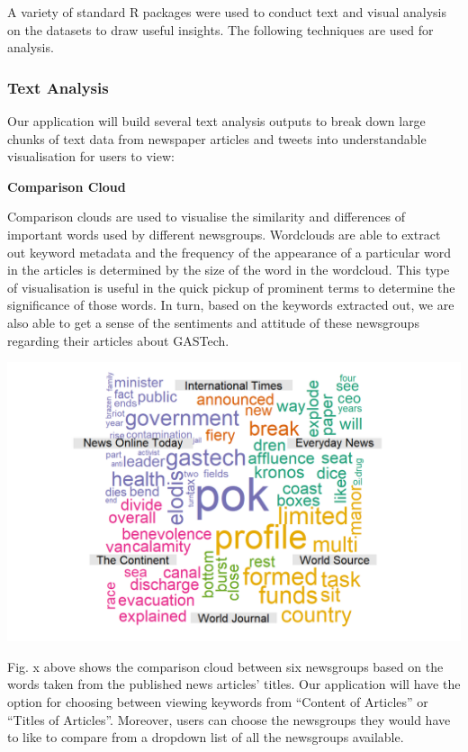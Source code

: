 \documentclass{acm_proc_article-sp}
\begin{document}
A variety of standard R packages were used to conduct text and visual
analysis on the datasets to draw useful insights. The following
techniques are used for analysis.

\hypertarget{text-analysis}{%
\subsubsection{Text Analysis}\label{text-analysis}}

Our application will build several text analysis outputs to break down
large chunks of text data from newspaper articles and tweets into
understandable visualisation for users to view:

\textbf{Comparison Cloud}

Comparison clouds are used to visualise the similarity and differences
of important words used by different newsgroups. Wordclouds are able to
extract out keyword metadata and the frequency of the appearance of a
particular word in the articles is determined by the size of the word in
the wordcloud. This type of visualisation is useful in the quick pickup
of prominent terms to determine the significance of those words. In
turn, based on the keywords extracted out, we are also able to get a
sense of the sentiments and attitude of these newsgroups regarding their
articles about GASTech.

\includegraphics{img/image03.png}

Fig. x above shows the comparison cloud between six newsgroups based on
the words taken from the published news articles' titles. Our
application will have the option for choosing between viewing keywords
from ``Content of Articles'' or ``Titles of Articles''. Moreover, users
can choose the newsgroups they would have to like to compare from a
dropdown list of all the newsgroups available.
\end{document}
